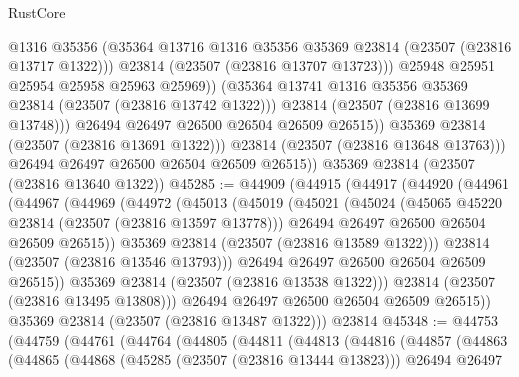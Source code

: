 \begin{lexlean}{RustCore}
\begin{coremodule}
                        @1316
                        @35356
                        (@35364 @13716 @1316 @35356 @35369 @23814 (@23507 (@23816 @13717 @1322)))
                        @23814
                        (@23507 (@23816 @13707 @13723)))
                      @25948
                      @25951
                      @25954
                      @25958
                      @25963
                      @25969))
                  (@35364 @13741 @1316 @35356 @35369 @23814 (@23507 (@23816 @13742 @1322)))
                  @23814
                  (@23507 (@23816 @13699 @13748)))
                @26494
                @26497
                @26500
                @26504
                @26509
                @26515))
            @35369
            @23814
            (@23507 (@23816 @13691 @1322)))
          @23814
          (@23507 (@23816 @13648 @13763)))
        @26494
        @26497
        @26500
        @26504
        @26509
        @26515))
    @35369
    @23814
    (@23507 (@23816 @13640 @1322))
@45285 := @44909
    (@44915
      (@44917
        (@44920
          (@44961
            (@44967
              (@44969
                (@44972
                  (@45013
                    (@45019
                      (@45021
                        (@45024
                          (@45065 @45220 @23814 (@23507 (@23816 @13597 @13778)))
                          @26494
                          @26497
                          @26500
                          @26504
                          @26509
                          @26515))
                      @35369
                      @23814
                      (@23507 (@23816 @13589 @1322)))
                    @23814
                    (@23507 (@23816 @13546 @13793)))
                  @26494
                  @26497
                  @26500
                  @26504
                  @26509
                  @26515))
              @35369
              @23814
              (@23507 (@23816 @13538 @1322)))
            @23814
            (@23507 (@23816 @13495 @13808)))
          @26494
          @26497
          @26500
          @26504
          @26509
          @26515))
      @35369
      @23814
      (@23507 (@23816 @13487 @1322)))
    @23814
@45348 := @44753
    (@44759
      (@44761
        (@44764
          (@44805
            (@44811
              (@44813
                (@44816
                  (@44857
                    (@44863
                      (@44865
                        (@44868
                          (@45285 (@23507 (@23816 @13444 @13823)))
                          @26494
                          @26497

\end{coremodule}
\end{lexlean}
